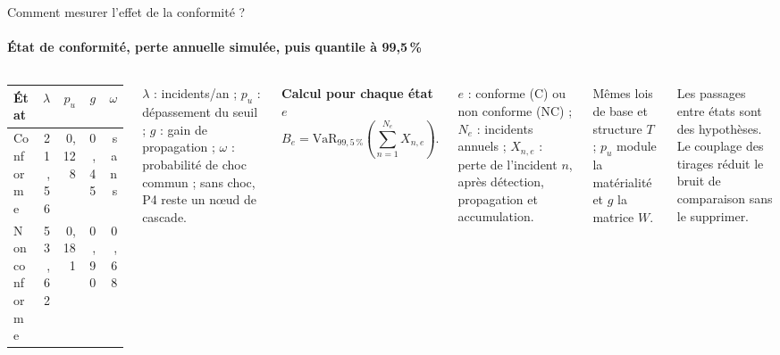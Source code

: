 \documentclass[aspectratio=169,10pt,t]{beamer}
\newcommand{\VaR}{\mathrm{VaR}}
\renewcommand{\arraystretch}{1.25}
\begin{document}
\begin{frame}{Comment mesurer l'effet de la conformité ?}
  \framesubtitle{\ajout État de conformité, perte annuelle simulée, puis quantile à 99,5\,\%}
  \begin{columns}[T,onlytextwidth]
    \footnotesize
    \renewcommand{\arraystretch}{1.3}
    \begin{tabularx}{\linewidth}{@{}Y r r r r@{}}
      \toprule
      \textbf{État} & $\lambda$ & $p_u$ & $g$ & $\omega$ \\
      \midrule
      Conforme & 21,56 & 0,128 & 0,45 & sans \\
      \textcolor{accent}{Non conforme} & 53,62 & 0,181 & 0,90 & 0,68 \\
      \bottomrule
    \end{tabularx}\par\vspace{1mm}
    {\scriptsize $\lambda$ : incidents/an ; $p_u$ : dépassement du seuil ; $g$ : gain de propagation ; $\omega$ : probabilité de choc commun ; sans choc, P4 reste un nœud de cascade.\par}\vspace{1mm}
    \textbf{Calcul pour chaque état $e$}
    \setlength{\abovedisplayskip}{1mm}\setlength{\belowdisplayskip}{1mm}
    \setlength{\abovedisplayshortskip}{1mm}\setlength{\belowdisplayshortskip}{1mm}
    \[B_e=\VaR_{99{,}5\,\%}\!\left(\sum_{n=1}^{N_e}X_{n,e}\right).\]
    {\scriptsize $e$ : conforme (C) ou non conforme (NC) ; $N_e$ : incidents annuels ; $X_{n,e}$ : perte de l'incident $n$, après détection, propagation et accumulation.\par\vspace{1mm}
    Mêmes lois de base et structure $T$ ; $p_u$ module la matérialité et $g$ la matrice $W$.\par\vspace{1mm}}
    {\scriptsize Les passages entre états sont des hypothèses. Le couplage des tirages réduit le bruit de comparaison sans le supprimer.}
    \centering
\end{columns}
\end{frame}
\end{document}
